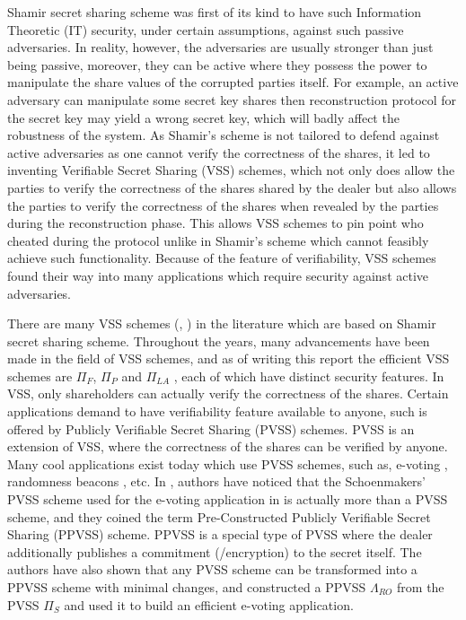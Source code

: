 Shamir secret sharing scheme was first of its kind to have such Information Theoretic (IT) security, 
under certain assumptions, against such passive adversaries. In reality, however, the adversaries 
are usually stronger than just being passive, moreover, they can be active where they 
possess the power to manipulate the share values of the corrupted parties itself. For example, 
an active adversary can manipulate some secret key shares then reconstruction protocol 
for the secret key may yield a wrong secret key, which will badly affect the robustness 
of the system. As Shamir's scheme is not tailored to defend against active adversaries as one cannot 
verify the correctness of the shares, it led to inventing Verifiable 
Secret Sharing (VSS) schemes, which not only does allow the parties to verify the 
correctness of the shares shared by the dealer but also allows the parties to verify 
the correctness of the shares when revealed by the parties during the reconstruction 
phase. This allows VSS schemes to pin point who cheated during the protocol unlike 
in Shamir's scheme which cannot feasibly achieve such functionality. 
Because of the feature of verifiability, VSS schemes found their way into 
many applications which require security against active adversaries.\par

There are many VSS schemes (\cite{d053b0be49644b2f932d703db8c1f8a0}, \cite{DBLP:conf/focs/Feldman87}) 
in the literature which are based on Shamir secret sharing scheme. Throughout the years, many advancements 
have been made in the field of VSS schemes, and as of writing this report the efficient VSS schemes are 
$\Pi_F$, $\Pi_P$ and $\Pi_{LA}$ \cite{cryptoeprint:2023/1669}, each of which have distinct security features. 
In VSS, only shareholders can actually verify the correctness of the shares. Certain applications demand 
to have verifiability feature available to anyone, such is offered by Publicly Verifiable Secret Sharing (PVSS) 
schemes. PVSS is an extension of VSS, where the correctness of the shares can be verified by anyone. Many 
cool applications exist today which use PVSS schemes, such as, e-voting \cite{5581ccd9530540479539d21d1d39ae96}, 
randomness beacons \cite{cryptoeprint:2017/216}, etc. In \cite{cryptoeprint:2025/576}, authors have noticed 
that the Schoenmakers' PVSS scheme used for the e-voting application in \cite{5581ccd9530540479539d21d1d39ae96} 
is actually more than a PVSS scheme, and they coined the term Pre-Constructed Publicly Verifiable Secret Sharing (PPVSS) scheme. 
PPVSS is a special type of PVSS where the dealer additionally publishes a commitment (/encryption) to the secret itself. 
The authors have also shown that any PVSS scheme can be transformed into a PPVSS scheme with minimal 
changes, and constructed a PPVSS $\Lambda_{RO}$ from the PVSS $\Pi_S$ \cite{cryptoeprint:2023/1669} and 
used it to build an efficient e-voting application.\par 

